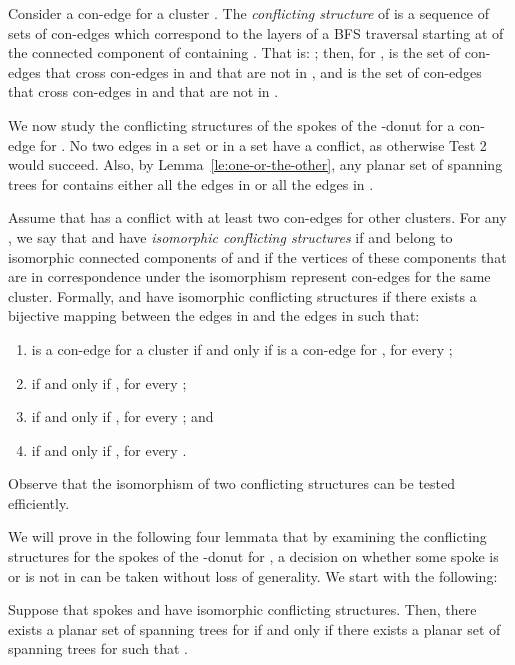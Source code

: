 \documentclass[letter,runningheads]{llncs}
\begin{document}
Consider a con-edge  for a cluster . The {\em conflicting structure}  of  is a sequence of sets  of con-edges which correspond to the layers of a BFS traversal starting at  of the connected component of  containing . That is: ; then, for ,  is the set of con-edges that cross con-edges in  and that are not in , and  is the set of con-edges that cross con-edges in  and that are not in .

We now study the conflicting structures of the spokes  of the -donut for a con-edge  for . No two edges in a set  or in a set  have a conflict, as otherwise {\sc Test 2} would succeed. Also, by Lemma~\ref{le:one-or-the-other}, any planar set  of spanning trees for  contains either all the edges in  or all the edges in .

Assume that  has a conflict with at least two con-edges for other clusters. For any , we say that  and  have {\em isomorphic conflicting structures} if  and  belong to isomorphic connected components of  and if the vertices of these components that are in correspondence under the isomorphism represent con-edges for the same cluster. Formally,  and  have isomorphic conflicting structures if there exists a bijective mapping  between the edges in  and the edges in  such that:
\begin{enumerate}
\item  is a con-edge for a cluster  if and only if  is a con-edge for , for every ;
\item  if and only if , for every ;
\item  if and only if , for every ; and
\item  if and only if , for every .
\end{enumerate}

Observe that the isomorphism of two conflicting structures can be tested efficiently.


We will prove in the following four lemmata that by examining the conflicting structures for the spokes of the -donut for , a decision on whether some spoke is or is not in  can be taken without loss of generality. We start with the following:

\begin{lemma}[{\sc Simplification 5}]\label{le:isomorphic}
Suppose that spokes  and  have isomorphic conflicting structures. Then, there exists a planar set  of spanning trees for  if and only if there exists a planar set  of spanning trees for  such that .
\end{lemma}
\end{document}
